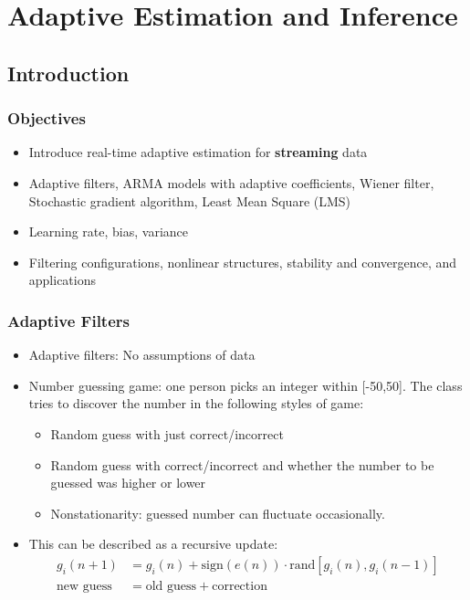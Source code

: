 \chapter{Adaptive Estimation and Inference}

\section{Introduction}
\subsection{Objectives}
\begin{itemize}
    \item Introduce real-time adaptive estimation for \textbf{streaming} data
    \item Adaptive filters, ARMA models with adaptive coefficients, Wiener filter, Stochastic gradient algorithm, Least Mean Square (LMS)
    \item Learning rate, bias, variance
    \item Filtering configurations, nonlinear structures, stability and convergence, and applications

\end{itemize}
\subsection{Adaptive Filters}
\begin{itemize}
    \item Adaptive filters: No assumptions of data
    \item Number guessing game: one person picks an integer within [-50,50]. The class tries to discover the number in the following styles of game:
    \begin{itemize}
        \item Random guess with just correct/incorrect
        \item Random guess with correct/incorrect and whether the number to be guessed was higher or 
        lower
        \item Nonstationarity: guessed number can fluctuate occasionally.
    \end{itemize}
    \item This can be described as a recursive update:
    \begin{align}
        g_i(n+1) &= g_i(n) + \text{sign}(e(n))\cdot\text{rand}[g_i(n), g_i(n-1)]\\
        \text{new guess} &= \text{old guess} +  \text{correction}
    \end{align}
\end{itemize}

